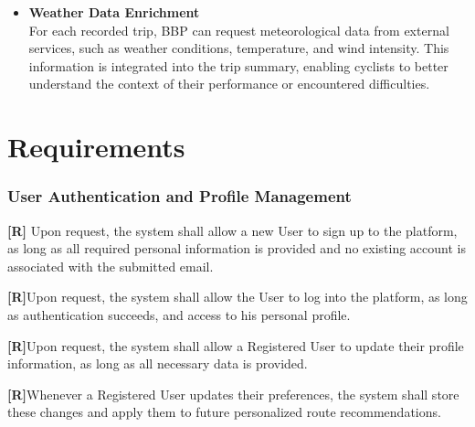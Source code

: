 \begin{itemize}
    \item \textbf{Weather Data Enrichment}\\
    For each recorded trip, BBP can request meteorological data from external services, such as weather conditions, temperature, and wind intensity. This information is integrated into the trip summary, enabling cyclists to better understand the context of their performance or encountered difficulties.


\end{itemize}


\section{Requirements}


\setcounter{req}{1}
\newcommand{\creq}{\thereq\stepcounter{req}}
\subsubsection*{User Authentication and Profile Management}

\item \textbf{[R\creq]} Upon request, the system shall allow a new User to sign up to the platform, as long as all required personal information is provided and no existing account is associated with the submitted email.

\item \textbf{[R\creq]}Upon request, the system shall allow the User to log into the platform, as long as authentication succeeds, and access to his personal profile.

\item \textbf{[R\creq]}Upon request, the system shall allow a Registered User to update their profile information, as long as all necessary data is provided.

\item \textbf{[R\creq]}Whenever a Registered User updates their preferences, the system shall store these changes and apply them to future personalized route recommendations.

